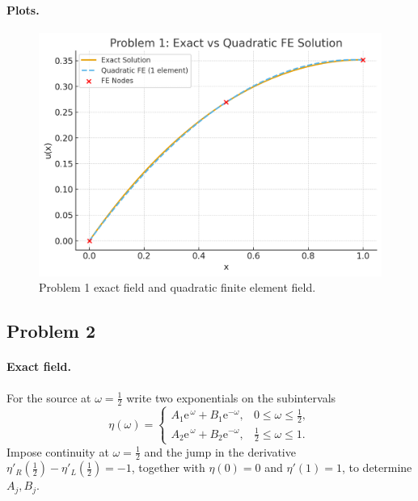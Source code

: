 \documentclass[12pt,a4paper]{article}
\begin{document}
\paragraph{Plots.}
\begin{figure}[H]
  \centering
  \includegraphics[width=0.7\linewidth]{hw3_prob1.png}
  \caption{Problem 1 exact field and quadratic finite element field.}
\end{figure}

\subsection*{Problem 2}
\paragraph{Exact field.}
For the source at \(\omega=\tfrac12\) write two exponentials on the subintervals
\[
\eta(\omega)=
\begin{cases}
A_1 \mathrm e^{\,\omega}+B_1 \mathrm e^{−\omega}, & 0\le \omega\le \tfrac12,\\[2pt]
A_2 \mathrm e^{\,\omega}+B_2 \mathrm e^{−\omega}, & \tfrac12\le \omega\le 1.
\end{cases}
\]
Impose continuity at \(\omega=\tfrac12\) and the jump in the derivative
\(
\eta'_R(\tfrac12)−\eta'_L(\tfrac12)=−1
\),
together with \(\eta(0)=0\) and \(\eta'(1)=1\), to determine \(A_j,B_j\).
\end{document}

